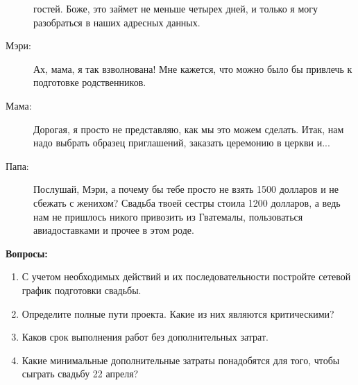 \documentclass[a4paper,12pt]{extarticle}
\begin{document}
\begin{description}
гостей. Боже, это займет не меньше четырех дней, и только я могу разобраться в
наших адресных данных.
\item[Мэри:] Ах, мама, я так взволнована! Мне кажется, что можно было бы
привлечь к подготовке родственников.
\item[Мама:] Дорогая, я просто не представляю, как мы это можем сделать. Итак,
нам надо выбрать образец приглашений, заказать церемонию в церкви и...
\item[Папа:] Послушай, Мэри, а почему бы тебе просто не взять 1500 долларов и
не сбежать с женихом? Свадьба твоей сестры стоила 1200 долларов, а ведь нам не
пришлось никого привозить из Гватемалы, пользоваться авиадоставками и прочее
в этом роде.
\end{description}

\textbf{Вопросы:}
\begin{enumerate}
\item С учетом необходимых действий и их последовательности постройте
сетевой график подготовки свадьбы.
\item Определите полные пути проекта. Какие из них являются критическими?
\item Каков срок выполнения работ без дополнительных затрат.
\item Какие минимальные дополнительные затраты понадобятся для того, чтобы сыграть
свадьбу 22 апреля?
\end{enumerate}
\end{document}
